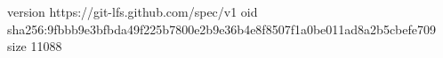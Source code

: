 version https://git-lfs.github.com/spec/v1
oid sha256:9fbbb9e3bfbda49f225b7800e2b9e36b4e8f8507f1a0be011ad8a2b5cbefe709
size 11088
